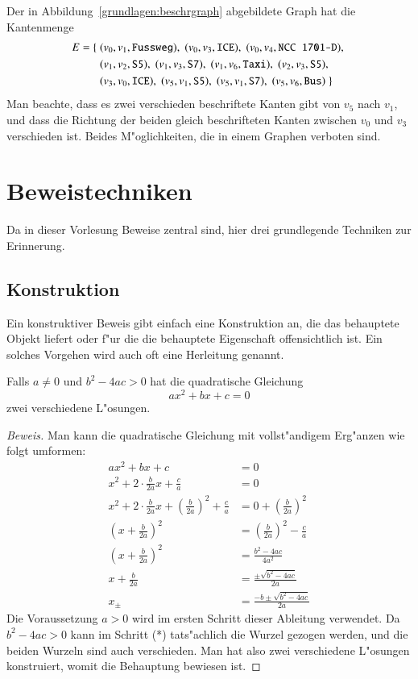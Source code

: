 Der in Abbildung~\ref{grundlagen:beschrgraph} abgebildete Graph
hat die Kantenmenge 
\begin{align*}
E=\{\;
&
(v_0,v_1,\text{\tt Fussweg}),\;
(v_0,v_3,\text{\tt ICE}),\;
(v_0,v_4,\text{\tt NCC 1701-D}),\;
\\&
(v_1,v_2,\text{\tt S5}),\;
(v_1,v_3,\text{\tt S7}),\;
(v_1,v_6,\text{\tt Taxi}),\;
(v_2,v_3,\text{\tt S5}),\;
\\&
(v_3,v_0,\text{\tt ICE}),\;
(v_5,v_1,\text{\tt S5}),\;
(v_5,v_1,\text{\tt S7}),\;
(v_5,v_6,\text{\tt Bus})\;
\}
\end{align*}
Man beachte, dass es zwei verschieden beschriftete Kanten gibt
von $v_5$ nach $v_1$, und dass die Richtung der beiden gleich
beschrifteten Kanten zwischen $v_0$ und $v_3$ verschieden ist.
Beides M"oglichkeiten, die in einem Graphen verboten sind.

\section{Beweistechniken}
Da in dieser Vorlesung Beweise zentral sind, hier drei grundlegende 
Techniken zur Erinnerung.

\subsection{Konstruktion}
Ein konstruktiver Beweis gibt einfach eine Konstruktion an, die
das behauptete Objekt liefert oder f"ur die die behauptete Eigenschaft
offensichtlich ist.
Ein solches Vorgehen wird auch oft eine Herleitung genannt.

\begin{satz}
Falls $a\ne0$ und $b^2-4ac>0$ hat die quadratische Gleichung
\[
ax^2+bx+c=0
\]
zwei verschiedene L"osungen.
\end{satz}

\begin{proof}[Beweis]
Man kann die quadratische Gleichung mit vollst"andigem Erg"anzen wie
folgt umformen:
{
\allowdisplaybreaks
\begin{align*}
ax^2+bx+c&=0\\
x^2+2\cdot \frac{b}{2a} x +\frac{c}a&=0\\
x^2+2\cdot \frac{b}{2a} x 
+\left(\frac{b}{2a}\right)^2
+\frac{c}a&=0
+\left(\frac{b}{2a}\right)^2\\
\left(x+\frac{b}{2a}\right)^2 &= \left(\frac{b}{2a}\right)^2 -\frac{c}a \\
\left(x+\frac{b}{2a}\right)^2 &=
\frac{b^2-4ac}{4a^2}\\
x+\frac{b}{2a}&=\frac{\pm\sqrt{b^2-4ac}}{2a}\tag{*}\\
x_{\pm}&=\frac{-b\pm\sqrt{b^2-4ac}}{2a}
\end{align*}
}
Die Voraussetzung $a>0$ wird im ersten Schritt dieser Ableitung verwendet.
Da $b^2-4ac>0$ kann im Schritt (*) tats"achlich die Wurzel gezogen werden,
und die beiden Wurzeln sind auch verschieden. Man hat also zwei verschiedene
L"osungen konstruiert, womit die Behauptung bewiesen ist.
\end{proof}

